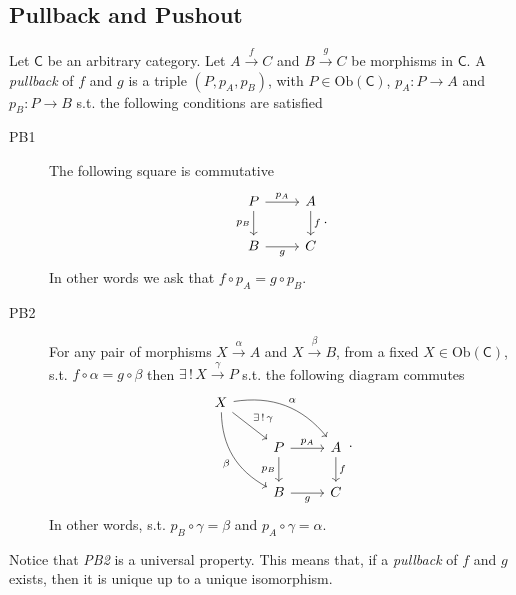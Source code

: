 \subsection{Pullback and Pushout}
\begin{defn}[Pullback]
	Let $\mathsf{C}$ be an arbitrary category.
	Let $A \xrightarrow{f} C$ and $B \xrightarrow{g} C$ be morphisms in $\mathsf{C}$.
	A {\em pullback} of $f$ and $g$ is a triple $\left(P, p_A, p_B\right)$, with $P \in \mathrm{Ob} \left(\mathsf{C}\right)$, $p_A\colon P \to A$ and $p_B\colon P \to B$ s.t. the following conditions are satisfied
	\begin{description}
		\item[PB1] The following square is commutative
			\begin{equation}
			\begin{tikzcd}
				P \arrow[r, "p_A", rightarrow] \arrow[d, "p_B"', rightarrow] & A \arrow[d, "f", rightarrow] \\
				B \arrow[r, "g"', rightarrow] & C
			\end{tikzcd}
			.\end{equation} 
			In other words we ask that $f \circ p_A = g \circ p_B$.
		\item[PB2] For any pair of morphisms $X \xrightarrow{\alpha} A$ and $X \xrightarrow{\beta} B$, from a fixed $X \in \mathrm{Ob} \left(\mathsf{C}\right)$, s.t. $f \circ \alpha = g \circ \beta$ then $\exists\, !\, X \xrightarrow{\gamma} P$ s.t. the following diagram commutes
			\begin{equation}
			\begin{tikzcd}
				X \arrow[rd, "\exists\, !\, \gamma", rightarrow] \arrow[rrd, "\alpha", rightarrow, bend left] \arrow[rdd, "\beta"', rightarrow, bend right] &  & \\
			   & P \arrow[r, "p_A", rightarrow] \arrow[d, "p_B"', rightarrow] & A \arrow[d, "f", rightarrow] \\
			   & B \arrow[r, "g"', rightarrow] & C
			\end{tikzcd}
			.\end{equation} 
			In other words, s.t. $p_B \circ \gamma = \beta$ and $p_A \circ \gamma = \alpha$.
	\end{description} 
\end{defn}
		
\begin{rem}
	Notice that {\em PB2} is a universal property.
	This means that, if a {\em pullback} of $f$ and $g$ exists, then it is unique up to a unique isomorphism.
\end{rem}

